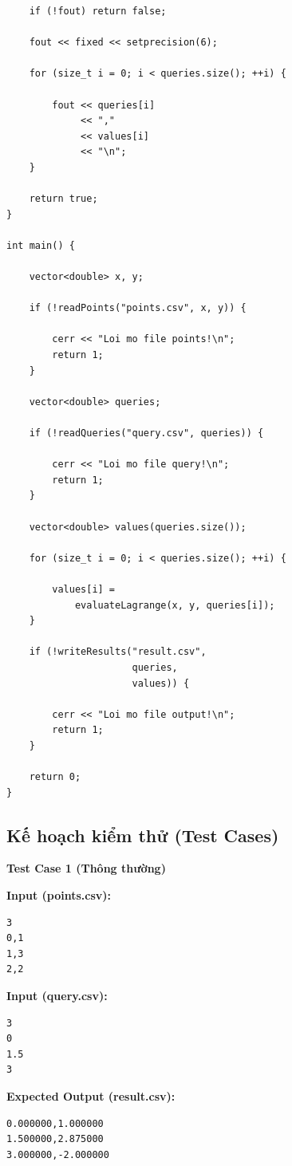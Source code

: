 \begin{lstlisting}
    if (!fout) return false;

    fout << fixed << setprecision(6);

    for (size_t i = 0; i < queries.size(); ++i) {

        fout << queries[i]
             << ","
             << values[i]
             << "\n";
    }

    return true;
}

int main() {

    vector<double> x, y;

    if (!readPoints("points.csv", x, y)) {

        cerr << "Loi mo file points!\n";
        return 1;
    }

    vector<double> queries;

    if (!readQueries("query.csv", queries)) {

        cerr << "Loi mo file query!\n";
        return 1;
    }

    vector<double> values(queries.size());

    for (size_t i = 0; i < queries.size(); ++i) {

        values[i] =
            evaluateLagrange(x, y, queries[i]);
    }

    if (!writeResults("result.csv",
                      queries,
                      values)) {

        cerr << "Loi mo file output!\n";
        return 1;
    }

    return 0;
}
\end{lstlisting}

\subsection{Kế hoạch kiểm thử (Test Cases)}

\textbf{Test Case 1 (Thông thường)}

\textbf{Input (points.csv):}

\begin{lstlisting}
3
0,1
1,3
2,2
\end{lstlisting}

\textbf{Input (query.csv):}

\begin{lstlisting}
3
0
1.5
3
\end{lstlisting}

\textbf{Expected Output (result.csv):}

\begin{lstlisting}
0.000000,1.000000
1.500000,2.875000
3.000000,-2.000000
\end{lstlisting}

